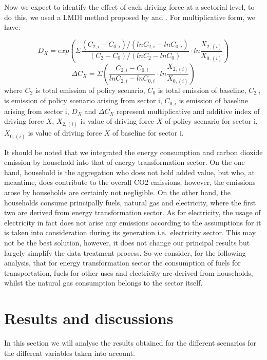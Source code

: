 \documentclass[
]{article}
\begin{document}
Now we expect to identify the effect of each driving force at a
sectorial level, to do this, we used a LMDI method proposed by
\textcite{ang1997} and \textcite{ang2005}. For multiplicative form, we
have:

\[ D_{X} = exp ( \Sigma \frac{(C_{2,i}-C_{0,i})/(lnC_{2,i}-lnC_{0,i})}{(C_{2}-C_{0})/(lnC_{2}-lnC_{0})} \cdot ln \frac{X_{2,(i)}}{X_{0,(i)}} ) \tag{11}\]
\[ \Delta C_{X} =  \Sigma (\frac{C_{2,i}-C_{0,i}}{lnC_{2,i}-lnC_{0,i}} \cdot ln\frac{X_{2,(i)}}{X_{0,(i)}}) \tag{12} \]
where \(C_{2}\) is total emission of policy scenario, \(C_{0}\) is total
emission of baseline, \(C_{2,i}\) is emission of policy scenario arising
from sector i, \(C_{0,i}\) is emission of baseline arising from sector
i, \(D_{X}\) and \(\Delta C_{X}\) represent multiplicative and additive
index of driving force \(X\), \(X_{2,(i)}\) is value of driving force
\(X\) of policy scenario for sector i, \(X_{0,(i)}\) is value of driving
force \(X\) of baseline for sector i.

It should be noted that we integrated the energy consumption and carbon
dioxide emission by household into that of energy transformation sector.
On the one hand, household is the aggregation who does not hold added
value, but who, at meantime, does contribute to the overall CO2
emissions, however, the emissions arose by households are certainly not
negligible. On the other hand, the households consume principally fuels,
natural gas and electricity, where the first two are derived from energy
transformation sector. As for electricity, the usage of electricity in
fact does not arise any emissions according to the assumptions for it is
taken into consideration during its generation i.e.~electricity sector.
This may not be the best solution, however, it does not change our
principal results but largely simplify the data treatment process. So we
consider, for the following analysis, that for energy transformation
sector the consumption of fuels for transportation, fuels for other uses
and electricity are derived from households, whilst the natural gas
consumption belongs to the sector itself.

\hypertarget{results-and-discussions}{%
\section{Results and discussions}\label{results-and-discussions}}

In this section we will analyse the results obtained for the different
scenarios for the different variables taken into account.
\end{document}
